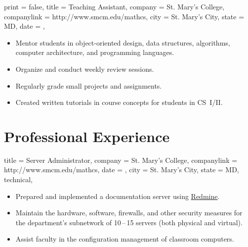 \documentclass{simplecv}
\begin{document}
\begin{position}
  {
    print   = false,
    title   = Teaching Assistant,
    company = St. Mary's College,
    companylink = http://www.smcm.edu/mathcs,
    city    = St. Mary's City,
    state   = MD,
    date    = ,
  }

\begin{itemize}
\item Mentor students in object-oriented design, data structures, algorithms, computer architecture, and programming languages.
\item Organize and conduct weekly review sessions.
\item Regularly grade small projects and assignments.
\item Created written tutorials in course concepts for students in CS~I\slash II.
\end{itemize}
\end{position}

\vfill
\section{Professional Experience}

\begin{position}
  {
    title   = Server Administrator,
    company = St. Mary's College,
    companylink = http://www.smcm.edu/mathcs,
    date    = ,
    city    = St. Mary's City,
    state   = MD,
    technical,
  }

\begin{itemize}
\item Prepared and implemented a documentation server using \href{http://www.redmine.org}{Redmine}.
\item Maintain the hardware, software, firewalls, and other security measures
  for the department's subnetwork of 10\,--\,15 servers (both physical and virtual).
\item Assist faculty in the configuration management of classroom computers.
\end{itemize}
\end{position}
\end{document}
